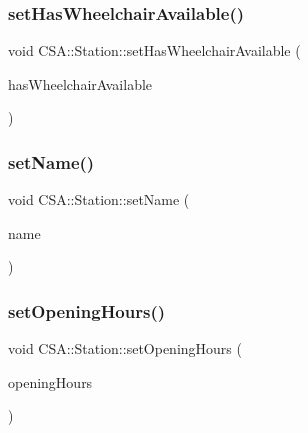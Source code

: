 \mbox{\label{classCSA_1_1Station_aaa5f121511df327da6e26336e84cef1f}} 
\subsubsection{\texorpdfstring{set\+Has\+Wheelchair\+Available()}{setHasWheelchairAvailable()}}
{\footnotesize\ttfamily void C\+S\+A\+::\+Station\+::set\+Has\+Wheelchair\+Available (\begin{DoxyParamCaption}\item[{const bool \&}]{has\+Wheelchair\+Available }\end{DoxyParamCaption})}

\mbox{\label{classCSA_1_1Station_adfcb40ad6f0e7a0011232475fa3aa11c}} 
\subsubsection{\texorpdfstring{set\+Name()}{setName()}}
{\footnotesize\ttfamily void C\+S\+A\+::\+Station\+::set\+Name (\begin{DoxyParamCaption}\item[{const Q\+Map$<$ Q\+Locale\+::\+Language, Q\+String $>$ \&}]{name }\end{DoxyParamCaption})}

\mbox{\label{classCSA_1_1Station_aa925896cc36685bc5d27c66d437cc12f}} 
\subsubsection{\texorpdfstring{set\+Opening\+Hours()}{setOpeningHours()}}
{\footnotesize\ttfamily void C\+S\+A\+::\+Station\+::set\+Opening\+Hours (\begin{DoxyParamCaption}\item[{const Q\+Map$<$ \mbox{\hyperlink{classCSA_1_1Station_aa160d0de40db0583099b5986dea1cd67}{C\+S\+A\+::\+Station\+::\+Day}}, Q\+Pair$<$ Q\+Time, Q\+Time $>$ $>$ \&}]{opening\+Hours }\end{DoxyParamCaption})}

